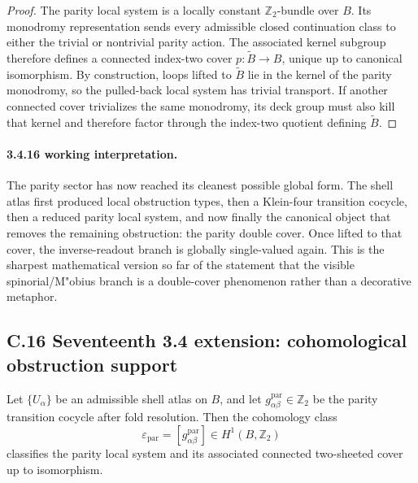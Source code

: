 \begin{proof}
The parity local system is a locally constant $\mathbb Z_2$-bundle over $B$. Its monodromy representation sends every admissible closed continuation class to either the trivial or nontrivial parity action. The associated kernel subgroup therefore defines a connected index-two cover $p:\widetilde B\to B$, unique up to canonical isomorphism. By construction, loops lifted to $\widetilde B$ lie in the kernel of the parity monodromy, so the pulled-back local system has trivial transport. If another connected cover trivializes the same monodromy, its deck group must also kill that kernel and therefore factor through the index-two quotient defining $\widetilde B$.
\end{proof}

\paragraph{3.4.16 working interpretation.}
The parity sector has now reached its cleanest possible global form. The shell atlas first produced local obstruction types, then a Klein-four transition cocycle, then a reduced parity local system, and now finally the canonical object that removes the remaining obstruction: the parity double cover. Once lifted to that cover, the inverse-readout branch is globally single-valued again. This is the sharpest mathematical version so far of the statement that the visible spinorial/M"obius branch is a double-cover phenomenon rather than a decorative metaphor.


\subsection*{C.16 Seventeenth 3.4 extension: cohomological obstruction support}

\begin{theorem}
\label{thm:appendix-3417}
Let $\{U_\alpha\}$ be an admissible shell atlas on $B$, and let $g^{\mathrm{par}}_{\alpha\beta}\in\mathbb Z_2$ be the parity transition cocycle after fold resolution. Then the cohomology class
\[
  \varepsilon_{\mathrm{par}}=[g^{\mathrm{par}}_{\alpha\beta}]\in H^1(B,\mathbb Z_2)
\]
classifies the parity local system and its associated connected two-sheeted cover up to isomorphism.
\end{theorem}

